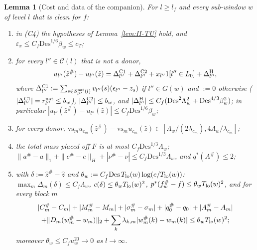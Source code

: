 \documentclass[10pt]{amsart}
\newtheorem{lemma}[theorem]{Lemma}
\theoremstyle{definition}
\theoremstyle{remark}
\newcommand{\zh}{\hat z}
\begin{document}
\begin{lemma}[Cost and data of the companion]\label{lem:II-compcost}
For $l\ge l_f$ and every sub-window $w$ of level $l$ that is clean for $f$:
\begin{enumerate}
\item[(a)] in (C4) the hypotheses of Lemma~\textup{\ref{lem:II-TU}} hold, and
$\varepsilon_x\le C_f\mathrm{Des}^{1/6}\beta_w\le c_T$;
\item[(b)] for every $l''\in\mathcal C(l)$ that is not a donor,
\[
 u_{l''}(\zh^\#)-u_{l''}(\zh)=\Delta^{\rm C1}_{l''}+\Delta^{\rm C2}_{l''}+
 x_{l''}1[l''\in L_0]+\Delta^{\rm H}_{l''},
\]
where $\Delta^{\rm C1}_{l''}:=\sum_{s\in S^{\rm nat}_{l''}(l)}v_{l''}(s)
(\epsilon_{l''}-z_s)$ if $l''\in G(w)$ and $:=0$ otherwise
($|\Delta^{\rm C1}_{l''}|=r^{\rm nat}_{l''}\le b_w$),
$|\Delta^{\rm C2}_{l''}|\le b_w$, and $|\Delta^{\rm H}_{l''}|\le C_f(
\mathrm{Des}^2\Lambda_w^2+\mathrm{Des}^{4/3}\beta_w^2)$; in particular
$|u_{l''}(\zh^\#)-u_{l''}(\zh)|\le C_f\mathrm{Des}^{1/6}\beta_w$;
\item[(c)] for every donor, $\mathrm{vs}_mu_{c_m}(\zh^\#)-\mathrm{vs}_m
u_{c_m}(\zh)\in[\Lambda_w/(2\lambda_{c_m}),4\Lambda_w/\lambda_{c_m}]$;
\item[(d)] the total mass placed off $F$ is at most $C_f\mathrm{Des}^{1/3}
\Lambda_w$; $\|a^\#-a\|_1+\|e^\#-e\|_H+|\nu^\#-\nu|\le C_f\mathrm{Des}^{1/3}
\Lambda_w$, and $q^*(A^\#)\le2$;
\item[(e)] with $\delta:=\zh^\#-\zh$ and $\theta_w:=C_f\mathrm{Des}\,
T_{\rm lo}(w)\log(e/T_{\rm lo}(w))$:
$\max_m\Delta_m(\delta)\le C_f\Lambda_w$, $c(\delta)\le\theta_wT_{\rm lo}(w)^2$,
$p^*(f^\#_w-f)\le\theta_wT_{\rm lo}(w)^2$, and for every block $m$
\begin{multline*}
 |C^\#_m-C_m|+|M^\#_m-M_m|+|\sigma^\#_m-\sigma_m|+|q^\#_0-q_0|+|A^\#_m-A_m|\\
 +\|D_m(w^\#_m-w_m)\|_2+\sum_k\lambda_{k,m}|w^\#_m(k)-w_m(k)|\le\theta_w
 T_{\rm lo}(w)^2 ;
\end{multline*}
moreover $\theta_w\le C_fu_w^{20}\to0$ as $l\to\infty$.
\end{enumerate}
\end{lemma}
\end{document}
